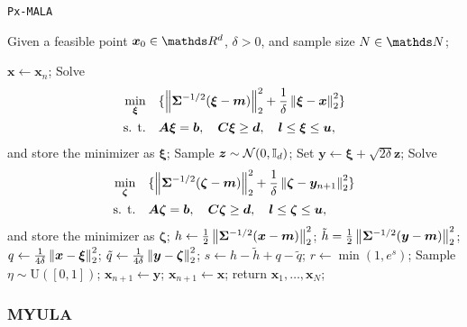 \documentclass[10pt]{article}
\numberwithin{equation}{section}
\begin{document}
\begin{algorithm}[H]
\caption{\texttt{Px-MALA}}
Given a feasible point $\bm x_0 \in \R^d$, $\delta > 0$, and sample size $N \in \N$;
\begin{algorithmic}[2]\label{alg:pxmala}
\State $\bm x \gets \bm x_n$;
\State Solve
\begin{align*}
\min_{\bm \xi} & \quad \lbrace \left\|\bm \Sigma^{-1/2}(\bm \xi - \bm m)\right\|_2^2 + \frac{1}{\delta} \left\|\bm \xi - \bm x\right\|_2^2 \rbrace \\
\text{s. t.} & \quad \bm A \bm \xi = \bm b, \quad \bm C \bm \xi \geq \bm d, \quad \bm l \leq \bm \xi \leq \bm u,
\end{align*}
and store the minimizer as $\bm \xi$;
\State Sample $\bm z \sim \mathcal{N}(0, \mathbb{I}_d)$;
\State Set $\bm y \gets \bm \xi + \sqrt{2 \delta} \bm z$;
\State Solve
\begin{align*}
\min_{\bm \zeta} & \quad \lbrace \left\|\bm \Sigma^{-1/2}(\bm \zeta - \bm m)\right\|_2^2 + \frac{1}{\delta} \left\|\bm \zeta - \bm y_{n+1}\right\|_2^2 \rbrace \\
\text{s. t.} & \quad \bm A \bm \zeta = \bm b, \quad \bm C \bm \zeta \geq \bm d, \quad \bm l \leq \bm \zeta \leq \bm u,
\end{align*}
and store the minimizer as $\bm \zeta$;
\State $h \gets \frac{1}{2} \left\|\bm \Sigma^{-1/2}(\bm x - \bm m)\right\|_2^2$;
\State $\tilde h = \frac{1}{2} \left\|\bm \Sigma^{-1/2}(\bm y - \bm m)\right\|_2^2$;
\State $q \gets \frac{1}{4 \delta}\left\|\bm x - \bm \xi\right\|_2^2$;
\State $\tilde q \gets \frac{1}{4 \delta}\left\|\bm y - \bm \zeta\right\|_2^2$;
\State $s \gets h - \tilde h + q - \tilde q$;
\State $r \gets \min(1, e^s)$;
\State Sample $\eta \sim \mathrm{U}([0,1])$;
\State $\bm x_{n+1} \gets \bm y$;
\Else
\State $\bm x_{n+1} \gets \bm x$;
\EndIf
\EndFor
\State return $\bm x_1, \ldots, \bm x_N$;
\end{algorithmic}
\end{algorithm}


\subsubsection*{MYULA}
\end{document}
